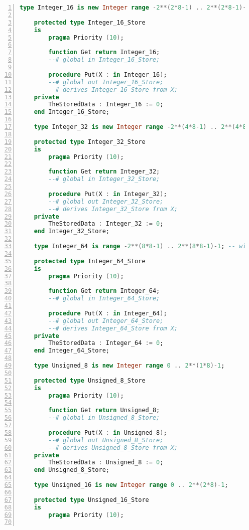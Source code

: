 \begin{lstlisting}[language=ada, gobble=0, numbers=left, caption={\lstinline{Base_Types} package}, label={listing:pca_generated:base_types}]
    type Integer_16 is new Integer range -2**(2*8-1) .. 2**(2*8-1)-1;

    protected type Integer_16_Store
    is
        pragma Priority (10);

        function Get return Integer_16;
        --# global in Integer_16_Store;

        procedure Put(X : in Integer_16);
        --# global out Integer_16_Store;
        --# derives Integer_16_Store from X;
    private
        TheStoredData : Integer_16 := 0;
    end Integer_16_Store;

    type Integer_32 is new Integer range -2**(4*8-1) .. 2**(4*8-1)-1;

    protected type Integer_32_Store
    is
        pragma Priority (10);

        function Get return Integer_32;
        --# global in Integer_32_Store;

        procedure Put(X : in Integer_32);
        --# global out Integer_32_Store;
        --# derives Integer_32_Store from X;
    private
        TheStoredData : Integer_32 := 0;
    end Integer_32_Store;

    type Integer_64 is range -2**(8*8-1) .. 2**(8*8-1)-1; -- with new Integer gnat compiler error: value not in range of type "Standard.Integer"

    protected type Integer_64_Store
    is
        pragma Priority (10);

        function Get return Integer_64;
        --# global in Integer_64_Store;

        procedure Put(X : in Integer_64);
        --# global out Integer_64_Store;
        --# derives Integer_64_Store from X;
    private
        TheStoredData : Integer_64 := 0;
    end Integer_64_Store;

    type Unsigned_8 is new Integer range 0 .. 2**(1*8)-1;

    protected type Unsigned_8_Store
    is
        pragma Priority (10);

        function Get return Unsigned_8;
        --# global in Unsigned_8_Store;

        procedure Put(X : in Unsigned_8);
        --# global out Unsigned_8_Store;
        --# derives Unsigned_8_Store from X;
    private
        TheStoredData : Unsigned_8 := 0;
    end Unsigned_8_Store;

    type Unsigned_16 is new Integer range 0 .. 2**(2*8)-1;

    protected type Unsigned_16_Store
    is
        pragma Priority (10);


\end{lstlisting}
